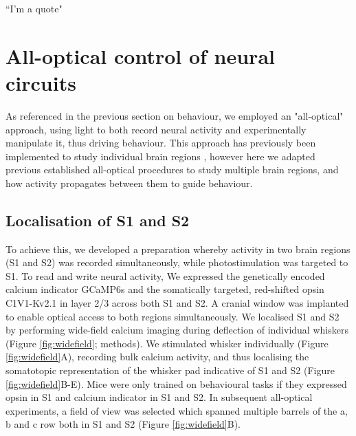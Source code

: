 \begin{savequote}[8cm]
“I'm a quote"
\end{savequote}

\chapter{\label{res2}All-optical control of neural circuits}

\minitoc

As referenced in the previous section on behaviour, we employed an "all-optical" approach, using light to both record neural activity and experimentally manipulate it, thus driving behaviour. This approach has previously been implemented to study individual brain regions \cite{dalgleish_how_2020, gill_precise_2020, russell_influence_2019, daie_targeted_2021, marshel_cortical_2019}, however here we adapted previous established all-optical procedures to study multiple brain regions, and how activity propagates between them to guide behaviour. 

\section{Localisation of S1 and S2}

To achieve this, we developed a preparation whereby activity in two brain regions (S1 and S2) was recorded simultaneously, while photostimulation was targeted to S1. To read and write neural activity, We expressed the genetically encoded calcium indicator GCaMP6s \cite{chen_ultrasensitive_2013} and the somatically targeted, red-shifted opsin C1V1-Kv2.1 \cite{yizhar_neocortical_2011, chettih_single-neuron_2019} in layer 2/3 across both S1 and S2. A cranial window was implanted to enable optical access to both regions simultaneously. We localised S1 and S2 by performing wide-field calcium imaging during deflection of individual whiskers (Figure \ref{fig:widefield}; methods). We stimulated whisker individually (Figure \ref{fig:widefield}A), recording bulk calcium activity, and thus localising the somatotopic representation of the whisker pad indicative of S1 and S2 (Figure \ref{fig:widefield}B-E). Mice were only trained on behavioural tasks if they expressed opsin in S1 and calcium indicator in S1 and S2. In subsequent all-optical experiments, a field of view was selected which spanned multiple barrels of the a, b and c row both in S1 and S2 (Figure \ref{fig:widefield}B).

